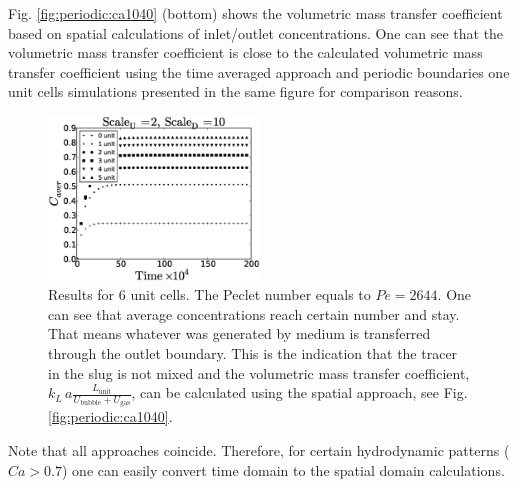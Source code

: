 \documentclass{article}
\newcommand{\vol}{k_L\,a}
\newcommand{\lunit}{L_{\mathrm{unit}}}
\newcommand{\ububble}{U_{\mathrm{bubble}}}
\newcommand{\ugas}{U_{\mathrm{gas}}}
\newcommand{\volnondim}{\vol \frac{\lunit}{\ububble+\ugas}}
\begin{document}
Fig. \ref{fig:periodic:ca1040}
(bottom) shows the volumetric mass transfer coefficient based on spatial calculations of
inlet/outlet concentrations. One can see that the volumetric mass transfer coefficient is close to
the calculated volumetric mass transfer coefficient using the time averaged approach and periodic
boundaries one unit cells simulations presented in the same figure for comparison reasons. 
\begin{figure}[htb!]
\begin{center}
\includegraphics[width=0.5\textwidth]{Figures/aver_units6scaleu2scaled5.eps}
\end{center}
\caption{Results for $6$ unit cells. The Peclet number equals to $Pe=2644$.
One can see that average concentrations reach certain number and stay.
That means whatever was
generated by medium is transferred through the outlet
boundary. This is the indication that the tracer in the slug is not
mixed and the volumetric mass transfer coefficient, $\volnondim$, can be
calculated using the spatial approach, see Fig.
\ref{fig:periodic:ca1040}.\label{fig:6:units:ca1040}}
\end{figure}
Note
that all approaches coincide. Therefore, for certain hydrodynamic patterns ($Ca>0.7$) one can easily convert time
domain to the spatial domain calculations.
\end{document}
